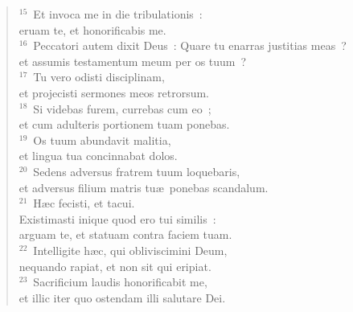 \begin{flushleft}
\begin{verse}
${}^{15}$~Et invoca me in die tribulationis~:\\ eruam te, et honorificabis me.\\
${}^{16}$~Peccatori autem dixit Deus~: Quare tu enarras justitias meas~?\\ et assumis testamentum meum per os tuum~?\\
${}^{17}$~Tu vero odisti disciplinam,\\ et projecisti sermones meos retrorsum.\\
${}^{18}$~Si videbas furem, currebas cum eo~;\\ et cum adulteris portionem tuam ponebas.\\
${}^{19}$~Os tuum abundavit malitia,\\ et lingua tua concinnabat dolos.\\
${}^{20}$~Sedens adversus fratrem tuum loquebaris,\\ et adversus filium matris tu\ae\ ponebas scandalum.\\
${}^{21}$~H\ae c fecisti, et tacui.\\ Existimasti inique quod ero tui similis~:\\ arguam te, et statuam contra faciem tuam.\\
${}^{22}$~Intelligite h\ae c, qui obliviscimini Deum,\\ nequando rapiat, et non sit qui eripiat.\\
${}^{23}$~Sacrificium laudis honorificabit me,\\ et illic iter quo ostendam illi salutare Dei.\end{verse}\end{flushleft}



